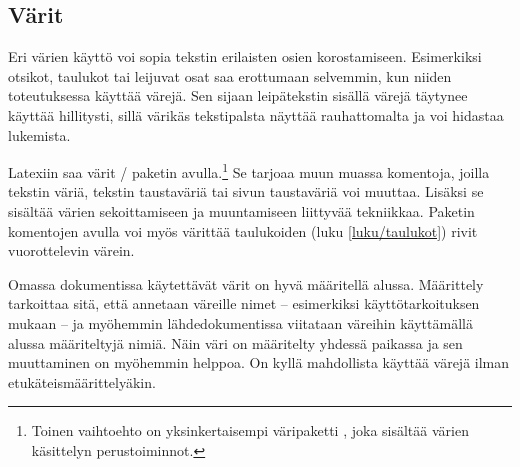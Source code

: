 \begin{koodilohkosis}
\newcommand{\sposti}[1]{\href{mailto:#1}{\nolinkurl{#1}}}
\end{koodilohkosis}

\subsection{Värit}
\label{luku/korostus-värit}

Eri värien käyttö voi sopia tekstin erilaisten osien korostamiseen.
Esimerkiksi otsikot, taulukot tai leijuvat osat saa erottumaan
selvemmin, kun niiden toteutuksessa käyttää värejä. Sen sijaan
leipätekstin sisällä värejä täytynee käyttää hillitysti, sillä värikäs
tekstipalsta näyttää rauhattomalta ja voi hidastaa lukemista.

Latexiin saa värit \-/ paketin
avulla.\footnote{Toinen vaihtoehto on yksinkertaisempi väripaketti
  , joka sisältää värien käsittelyn perustoiminnot.} Se
tarjoaa muun muassa komentoja, joilla tekstin väriä, tekstin taustaväriä
tai sivun taustaväriä voi muuttaa. Lisäksi se sisältää värien
sekoittamiseen ja muuntamiseen liittyvää tekniikkaa. Paketin komentojen
avulla voi myös värittää taulukoiden (luku \ref{luku/taulukot}) rivit
vuorottelevin värein.

Omassa dokumentissa käytettävät värit on hyvä määritellä alussa.
Määrittely tarkoittaa sitä, että annetaan väreille nimet -- esimerkiksi
käyttötarkoituksen mukaan -- ja myöhemmin lähdedokumentissa viitataan
väreihin käyttämällä alussa määriteltyjä nimiä. Näin väri on määritelty
yhdessä paikassa ja sen muuttaminen on myöhemmin helppoa. On kyllä
mahdollista käyttää värejä ilman etukäteismäärittelyäkin.


